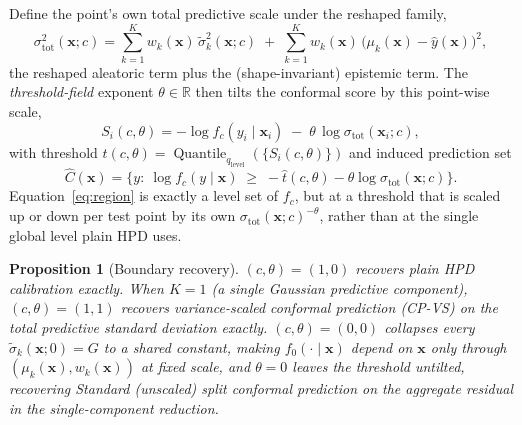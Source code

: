 \documentclass[10pt,twocolumn,a4paper]{article}
\newtheorem{proposition}{Proposition}
\begin{document}
Define the point's own total predictive scale
under the reshaped family,
\begin{equation}
\sigma_{\mathrm{tot}}^2(\bm x; c) = \sum_{k=1}^K w_k(\bm x)\,\tilde\sigma_k^2(\bm x;c) \;+\; \sum_{k=1}^K w_k(\bm x)\,\big(\mu_k(\bm x)-\hat y(\bm x)\big)^2,
\end{equation}
the reshaped aleatoric term plus the (shape-invariant) epistemic term. The \emph{threshold-field}
exponent $\theta\in\mathbb R$ then tilts the conformal score by this point-wise scale,
\begin{equation}
S_i(c,\theta) = -\log f_c(y_i\mid\bm x_i) \;-\; \theta\,\log\sigma_{\mathrm{tot}}(\bm x_i; c),
\label{eq:score}
\end{equation}
with threshold $\hat t(c,\theta) = \operatorname{Quantile}_{q_{\mathrm{level}}}(\{S_i(c,\theta)\})$
and induced prediction set
\begin{equation}
\hat C(\bm x) = \Big\{ y :\ \log f_c(y\mid\bm x) \;\ge\; -\hat t(c,\theta) - \theta\log\sigma_{\mathrm{tot}}(\bm x;c) \Big\}.
\label{eq:region}
\end{equation}
Equation~\eqref{eq:region} is exactly a level set of $f_c$, but at a threshold that is scaled up or
down per test point by its own $\sigma_{\mathrm{tot}}(\bm x;c)^{-\theta}$, rather than at the single
global level plain HPD uses.

\begin{proposition}[Boundary recovery]
\label{prop:recovery}
$(c,\theta)=(1,0)$ recovers plain HPD calibration exactly. When $K=1$ (a single Gaussian
predictive component), $(c,\theta)=(1,1)$ recovers variance-scaled conformal prediction (CP-VS) on
the total predictive standard deviation exactly. $(c,\theta)=(0,0)$ collapses every
$\tilde\sigma_k(\bm x;0)=G$ to a shared constant, making $f_0(\cdot\mid\bm x)$ depend on $\bm x$ only
through $(\mu_k(\bm x), w_k(\bm x))$ at fixed scale, and $\theta=0$ leaves the threshold untilted,
recovering Standard (unscaled) split conformal prediction on the aggregate residual in the
single-component reduction.
\end{proposition}
\end{document}
